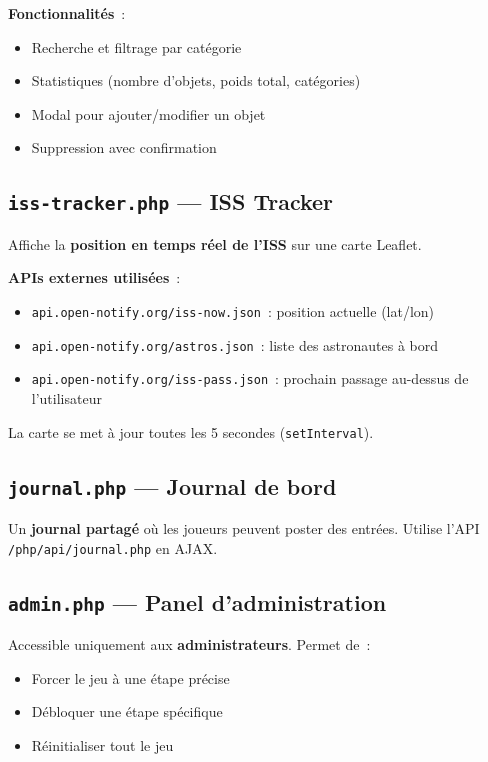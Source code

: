 \documentclass[12pt,a4paper]{article}
\begin{document}
\textbf{Fonctionnalités}~:
\begin{itemize}
    \item Recherche et filtrage par catégorie
    \item Statistiques (nombre d'objets, poids total, catégories)
    \item Modal pour ajouter/modifier un objet
    \item Suppression avec confirmation
\end{itemize}

\subsection{\texttt{iss-tracker.php} --- ISS Tracker}

Affiche la \textbf{position en temps réel de l'ISS} sur une carte Leaflet.

\textbf{APIs externes utilisées}~:
\begin{itemize}
    \item \texttt{api.open-notify.org/iss-now.json}~: position actuelle (lat/lon)
    \item \texttt{api.open-notify.org/astros.json}~: liste des astronautes à bord
    \item \texttt{api.open-notify.org/iss-pass.json}~: prochain passage au-dessus de l'utilisateur
\end{itemize}

La carte se met à jour toutes les 5 secondes (\texttt{setInterval}).

\subsection{\texttt{journal.php} --- Journal de bord}

Un \textbf{journal partagé} où les joueurs peuvent poster des entrées. Utilise l'API \texttt{/php/api/journal.php} en AJAX.

\subsection{\texttt{admin.php} --- Panel d'administration}

Accessible uniquement aux \textbf{administrateurs}. Permet de~:
\begin{itemize}
    \item Forcer le jeu à une étape précise
    \item Débloquer une étape spécifique
    \item Réinitialiser tout le jeu
\end{itemize}
\end{document}
